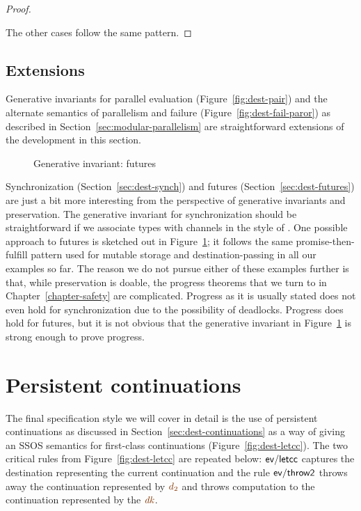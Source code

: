 \begin{proof}
\begin{description}
\medskip

\end{description}

\noindent
The other cases follow the same pattern.
\end{proof}

\subsection{Extensions}

Generative invariants for parallel evaluation
(Figure~\ref{fig:dest-pair}) and the alternate semantics of
parallelism and failure (Figure~\ref{fig:dest-fail-paror}) as
described in Section~\ref{sec:modular-parallelism} are
straightforward extensions of the development in this section.

\begin{figure}[tp]
\caption{Generative invariant: futures}
\label{fig:gen-future} 
\end{figure}

Synchronization (Section~\ref{sec:dest-synch}) and futures
(Section~\ref{sec:dest-futures}) are just a bit more interesting from
the perspective of generative invariants and preservation. The
generative invariant for synchronization should be straightforward if
we associate types with channels in the style of \cite[Section
41.5]{harper12practical}. One possible approach to futures is sketched
out in Figure~\ref{fig:gen-future}; it follows the same
promise-then-fulfill pattern used for mutable storage and
destination-passing in all our examples so far. The reason we do not
pursue either of these examples further is that, while preservation is
doable, the progress theorems that we turn to in
Chapter~\ref{chapter-safety} are complicated. Progress as it is
usually stated does not even hold for 
synchronization due to the possibility of deadlocks. Progress does
hold for futures, but it is not obvious that the generative invariant
in Figure~\ref{fig:gen-future} is strong enough to prove progress.


\section{Persistent continuations}
\label{sec:gen-letcc}

The final specification style we will cover in detail is the use of
persistent continuations as discussed in
Section~\ref{sec:dest-continuations} as a way of giving an SSOS
semantics for first-class continuations (Figure~\ref{fig:dest-letcc}).
The two critical rules from Figure~\ref{fig:dest-letcc} are repeated
below: ${\sf ev/letcc}$ captures the destination representing the
current continuation and the rule ${\sf ev/throw2}$ throws away
the continuation represented by $\lf{d_2}$ and throws computation to the
continuation represented by the
$\lf{\it dk}$. 

